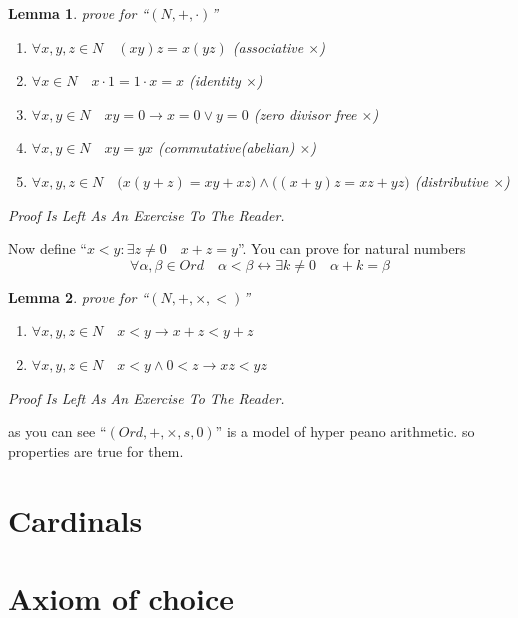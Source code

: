 \documentclass[10pt,a4paper]{book}
\newtheorem{lemma}{Lemma}[section]
\begin{document}
\begin{lemma}prove for ``$(N , + , \cdot)$''
    \begin{enumerate}
        \setlength{\itemsep}{0pt} %
        \item       $\forall x , y , z  \in N \quad (x y) z  = x (y z)  $ (associative $\times$)
        \item       $\forall x  \in N \quad x  \cdot 1 = 1 \cdot x  = x $ (identity  $\times$)
        \item       $\forall x  , y    \in N \quad   x   y  = 0   \to  x  = 0  \lor   y  = 0 $ (zero divisor free $\times$)
        \item       $\forall x , y  \in N \quad x y = y x$ (commutative(abelian)  $\times$)
        \item       $\forall x  , y  , z   \in N \quad \Big(x  ( y   +  z  ) = x   y   +  x   z   \Big)
                  \land     \Big((x   +  y  )   z   = x     z   +   y     z   \Big)  $ (distributive $\times$)
    \end{enumerate}
    Proof Is Left As An Exercise To The Reader.
\end{lemma}

Now define ``$ x < y : \exists z \not=0 \quad x + z = y $''. You can prove for
natural numbers
\[  \forall \alpha , \beta \in Ord \quad \alpha < \beta \leftrightarrow \exists k \not=0 \quad \alpha + k = \beta \]

\begin{lemma}prove for ``$(N , + , \times , <)$''
    \begin{enumerate}
        \setlength{\itemsep}{0pt} %
        \item       $\forall x , y , z \in N \quad x < y \to x + z < y + z  $
        \item       $\forall x , y , z \in N \quad x < y \land 0 < z \to x z < y z  $
    \end{enumerate}
    Proof Is Left As An Exercise To The Reader.
\end{lemma}

as you can see ``$(Ord , + , \times , s , 0)$'' is a model of hyper peano
arithmetic. so properties are true for them.

\chapter{Cardinals }

\chapter{Axiom of choice}
\end{document}
